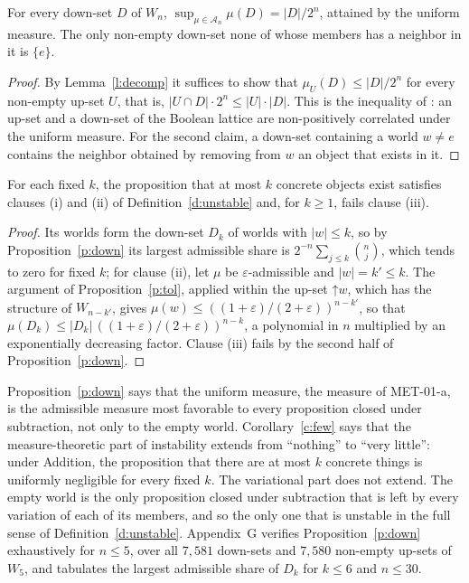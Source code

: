 \documentclass{situationist-preprint}
\begin{document}
\begin{proposition}\label{p:down}
For every down-set $D$ of $W_n$, $\sup_{\mu \in \mathcal{A}_n} \mu(D) = |D|/2^n$, attained by the uniform measure. The only non-empty down-set none of whose members has a neighbor in it is $\{e\}$.
\end{proposition}

\begin{proof}
By Lemma~\ref{l:decomp} it suffices to show that $\mu_U(D) \leq |D|/2^n$ for every non-empty up-set $U$, that is, $|U \cap D| \cdot 2^n \leq |U| \cdot |D|$. This is the inequality of \citet{Kleitman1966}: an up-set and a down-set of the Boolean lattice are non-positively correlated under the uniform measure. For the second claim, a down-set containing a world $w \neq e$ contains the neighbor obtained by removing from $w$ an object that exists in it.
\end{proof}

\begin{corollary}\label{c:few}
For each fixed $k$, the proposition that at most $k$ concrete objects exist satisfies clauses (i) and (ii) of Definition~\ref{d:unstable} and, for $k \geq 1$, fails clause (iii).
\end{corollary}

\begin{proof}
Its worlds form the down-set $D_k$ of worlds with $|w| \leq k$, so by Proposition~\ref{p:down} its largest admissible share is $2^{-n}\sum_{j \leq k}\binom{n}{j}$, which tends to zero for fixed $k$; for clause (ii), let $\mu$ be $\varepsilon$-admissible and $|w| = k' \leq k$. The argument of Proposition~\ref{p:tol}, applied within the up-set $\mathord{\uparrow} w$, which has the structure of $W_{n-k'}$, gives $\mu(w) \leq ((1+\varepsilon)/(2+\varepsilon))^{n-k'}$, so that $\mu(D_k) \leq |D_k|\,((1+\varepsilon)/(2+\varepsilon))^{n-k}$, a polynomial in $n$ multiplied by an exponentially decreasing factor. Clause (iii) fails by the second half of Proposition~\ref{p:down}.
\end{proof}

Proposition~\ref{p:down} says that the uniform measure, the measure of MET-01-a, is the admissible measure most favorable to every proposition closed under subtraction, not only to the empty world. Corollary~\ref{c:few} says that the measure-theoretic part of instability extends from \enquote{nothing} to \enquote{very little}: under Addition, the proposition that there are at most $k$ concrete things is uniformly negligible for every fixed $k$. The variational part does not extend. The empty world is the only proposition closed under subtraction that is left by every variation of each of its members, and so the only one that is unstable in the full sense of Definition~\ref{d:unstable}. Appendix~G verifies Proposition~\ref{p:down} exhaustively for $n \leq 5$, over all $7{,}581$ down-sets and $7{,}580$ non-empty up-sets of $W_5$, and tabulates the largest admissible share of $D_k$ for $k \leq 6$ and $n \leq 30$.
\end{document}
